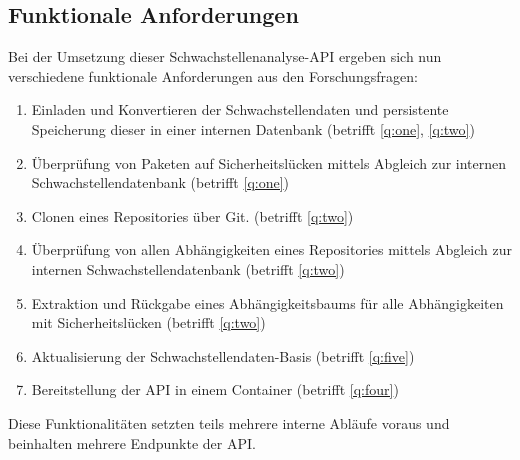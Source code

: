 \subsection{Funktionale Anforderungen} \label{sec:Funktionale_Anforderungen}
    Bei der Umsetzung dieser Schwachstellenanalyse-\ac{API} ergeben sich nun verschiedene funktionale Anforderungen aus den Forschungsfragen:
    \begin{enumerate}[label=\textbf{FRQ-\Roman*}, leftmargin=2.5cm]
        \item Einladen und Konvertieren der Schwachstellendaten und persistente Speicherung dieser in einer internen Datenbank (betrifft \ref{q:one}, \ref{q:two})\label{f:one}
        \item Überprüfung von Paketen auf Sicherheitslücken mittels Abgleich zur internen Schwachstellendatenbank (betrifft \ref{q:one}) \label{f:two}
        \item Clonen eines Repositories über Git. (betrifft \ref{q:two}) \label{f:three}
        \item Überprüfung von allen Abhängigkeiten eines Repositories mittels Abgleich zur internen Schwachstellendatenbank (betrifft \ref{q:two}) \label{f:four}
        \item Extraktion und Rückgabe eines Abhängigkeitsbaums für alle Abhängigkeiten mit Sicherheits\-lücken (betrifft \ref{q:two}) \label{f:five}
        \item Aktualisierung der Schwachstellendaten-Basis (betrifft \ref{q:five}) \label{f:six}
        \item Bereitstellung der \ac{API} in einem Container (betrifft \ref{q:four}) \label{f:seven}
    \end{enumerate}
    Diese Funktionalitäten setzten teils mehrere interne Abläufe voraus und beinhalten mehrere Endpunkte der \ac{API}.
